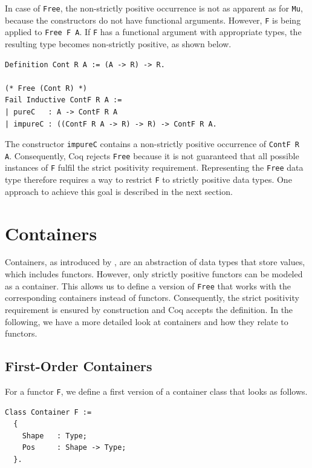 \documentclass[a4paper, 11pt, fleqn, twoside]{scrreprt}
\newcommand{\cinl}[1]{\texttt{#1}}
\begin{document}
In case of \cinl{Free}, the non-strictly positive occurrence is not as apparent as for \cinl{Mu}, because the constructors do not have functional arguments.
However, \cinl{F} is being applied to \texttt{Free F A}.
If \texttt{F} has a functional argument with appropriate types, the resulting type becomes non-strictly positive, as shown below.

\begin{verbatim}
Definition Cont R A := (A -> R) -> R.

(* Free (Cont R) *)
Fail Inductive ContF R A :=
| pureC   : A -> ContF R A
| impureC : ((ContF R A -> R) -> R) -> ContF R A.
\end{verbatim}

The constructor \texttt{impureC} contains a non-strictly positive occurrence of \texttt{ContF R A}.
Consequently, Coq rejects \texttt{Free} because it is not guaranteed that all possible instances of \cinl{F} fulfil the strict positivity requirement.
Representing the \texttt{Free} data type therefore requires a way to restrict \cinl{F} to strictly positive data types.
One approach to achieve this goal is described in the next section.

\section{Containers}

Containers, as introduced by \citet{Abbott2005containers}, are an abstraction of data types that store values, which includes functors.
However, only strictly positive functors can be modeled as a container.
This allows us to define a version of \cinl{Free} that works with the corresponding containers instead of functors.
Consequently, the strict positivity requirement is ensured by construction and Coq accepts the definition.
In the following, we have a more detailed look at containers and how they relate to functors.

\subsection{First-Order Containers}
For a functor \cinl{F}, we define a first version of a container class that looks as follows.

\begin{verbatim}
Class Container F :=
  {
    Shape   : Type;
    Pos     : Shape -> Type;
  }.
\end{verbatim}
\end{document}
